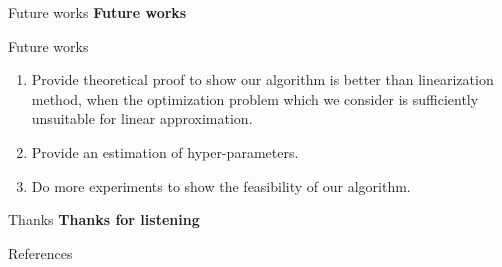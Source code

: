 \documentclass{beamer}
\begin{document}
\begin{frame}{Future works}
    \centering
    \textbf{Future works}
\end{frame}
\begin{frame}{Future works}
    \begin{enumerate}
    \item Provide theoretical proof to show our algorithm is better than linearization method,  when the optimization problem which we consider is sufficiently unsuitable for linear approximation.
    \item Provide an estimation of hyper-parameters.
    \item Do more experiments to show the feasibility of our algorithm.
    \end{enumerate}
\end{frame}

\begin{frame}{Thanks}
    \centering
    \textbf{Thanks for listening}
\end{frame}
\begin{frame}[allowframebreaks]{References}
    
    
\end{frame}
\end{document}
